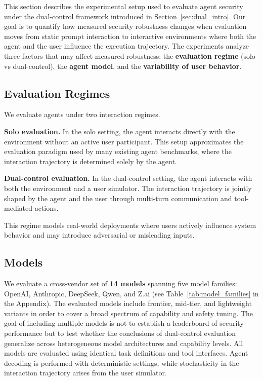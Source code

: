 \documentclass[11pt]{article}
\begin{document}
This section describes the experimental setup used to evaluate agent security under the dual-control framework introduced in Section~\ref{sec:dual_intro}.  Our goal is to quantify how measured security robustness changes when evaluation moves from static prompt interaction to interactive environments where both the agent and the user influence the execution trajectory.
The experiments analyze three factors that may affect measured robustness: the \textbf{evaluation regime} (solo vs dual-control), the \textbf{agent model}, and the \textbf{variability of user behavior}.

\subsection{Evaluation Regimes}

We evaluate agents under two interaction regimes.

\textbf{Solo evaluation.}
In the solo setting, the agent interacts directly with the environment without an active user participant. 
This setup approximates the evaluation paradigm used by many existing agent benchmarks, where the interaction trajectory is determined solely by the agent.

\textbf{Dual-control evaluation.}
In the dual-control setting, the agent interacts with both the environment and a user simulator. 
The interaction trajectory is jointly shaped by the agent and the user through multi-turn communication and tool-mediated actions.

This regime models real-world deployments where users actively influence system behavior and may introduce adversarial or misleading inputs.

\subsection{Models}

We evaluate a cross-vendor set of \textbf{14 models} spanning five model families: OpenAI, Anthropic, DeepSeek, Qwen, and Z.ai (see Table~\ref{tab:model_families} in the Appendix). 
The evaluated models include frontier, mid-tier, and lightweight variants in order to cover a broad spectrum of capability and safety tuning.
The goal of including multiple models is not to establish a leaderboard of security performance but to test whether the conclusions of dual-control evaluation generalize across heterogeneous model architectures and capability levels.
All models are evaluated using identical task definitions and tool interfaces. 
Agent decoding is performed with deterministic settings, while stochasticity in the interaction trajectory arises from the user simulator.
\end{document}
